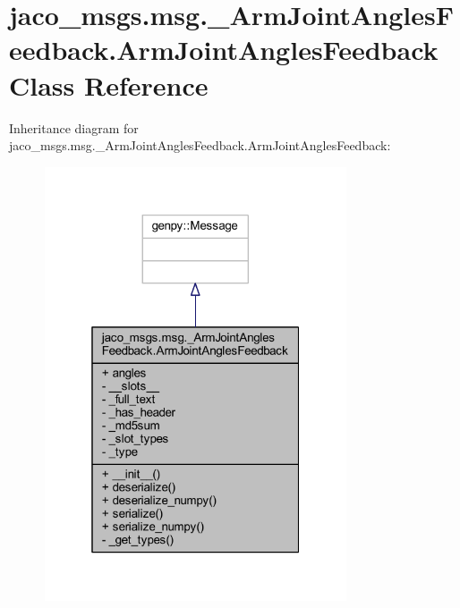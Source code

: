 \hypertarget{classjaco__msgs_1_1msg_1_1__ArmJointAnglesFeedback_1_1ArmJointAnglesFeedback}{}\section{jaco\+\_\+msgs.\+msg.\+\_\+\+Arm\+Joint\+Angles\+Feedback.\+Arm\+Joint\+Angles\+Feedback Class Reference}
\label{classjaco__msgs_1_1msg_1_1__ArmJointAnglesFeedback_1_1ArmJointAnglesFeedback}


Inheritance diagram for jaco\+\_\+msgs.\+msg.\+\_\+\+Arm\+Joint\+Angles\+Feedback.\+Arm\+Joint\+Angles\+Feedback\+:
\nopagebreak
\begin{figure}[H]
\begin{center}
\leavevmode
\includegraphics[width=253pt]{db/de9/classjaco__msgs_1_1msg_1_1__ArmJointAnglesFeedback_1_1ArmJointAnglesFeedback__inherit__graph}
\end{center}
\end{figure}


